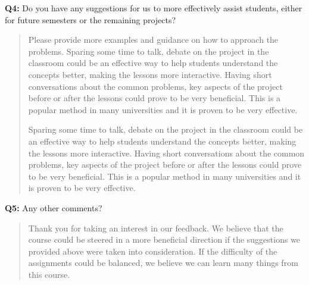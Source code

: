 \documentclass[a4paper,11pt]{paper}
\begin{document}
\newpage
\textbf{Q4:} Do you have any suggestions for us to more effectively assist students,
either for future semesters or the remaining projects?
\begin{quote}
  Please provide more examples and guidance on how to approach the problems.
	Sparing some time to talk, debate on the project in the classroom could be
	an effective way to help students understand the concepts better, making the lessons
	more interactive. Having short conversations about the common problems, key aspects
	of the project before or after the lessons could prove to be very beneficial.
	This is a popular method in many universities and it is proven to be very effective.

    Sparing some time to talk, debate on the project in the classroom could be
	an effective way to help students understand the concepts better, making the lessons
	more interactive. Having short conversations about the common problems, key aspects
	of the project before or after the lessons could prove to be very beneficial.
	This is a popular method in many universities and it is proven to be very effective.
\end{quote}

\textbf{Q5:} Any other comments?
\begin{quote}
Thank you for taking an interest in our feedback. We believe that the course
	could be steered in a more beneficial direction if the suggestions we provided
	above were taken into consideration. If the difficulty of the assignments could
	be balanced, we believe we can learn many things from this course.
\end{quote}
\end{document}
